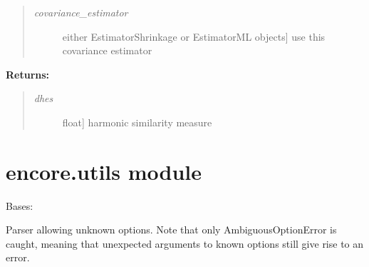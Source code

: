 \documentclass[letterpaper,10pt,english]{sphinxmanual}
\begin{document}
\begin{fulllineitems}
\begin{quote}
\begin{description}
\item[{\emph{covariance\_estimator}}] \leavevmode{[}either EstimatorShrinkage or EstimatorML objects{]}
use this covariance estimator

\end{description}
\end{quote}

\textbf{Returns:}
\begin{quote}
\begin{description}
\item[{\emph{dhes}}] \leavevmode{[}float{]}
harmonic similarity measure

\end{description}
\end{quote}

\end{fulllineitems}


\begin{fulllineitems}
\label{index:encore.similarity.write_output}
\end{fulllineitems}


\begin{fulllineitems}
\label{index:encore.similarity.write_output_line}
\end{fulllineitems}



\section{encore.utils module}
\label{index:encore-utils-module}\label{index:module-encore.utils}

\begin{fulllineitems}
\label{index:encore.utils.AllowUnrecognizedOptionParser}
Bases: 

Parser allowing unknown options. Note that only AmbiguousOptionError
is caught, meaning that unexpected arguments to known options still give
rise to an error.

\end{fulllineitems}
\end{document}
